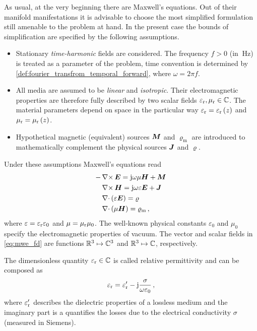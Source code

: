 As usual, at the very beginning there are Maxwell's equations.
Out of their manifold manifestations it is advisable to choose the most
simplified formulation still amenable to the problem at hand.
In the present case the bounds of simplification are specified by the following
assumptions.
\begin{itemize}
	\item Stationary \emph{time-harmonic} fields are considered.
	The frequency $f > 0$ (in $\SI{}{\hertz}$) is treated as a parameter of the
	problem, time convention is determined by
	\cref{def:fourier_transfrom_temporal_forward}, where $\omega = 2\pi f$.
	\item All media are assumed to be \emph{linear} and \emph{isotropic}.
	Their electromagnetic properties are therefore fully described by two scalar
	fields $\varepsilon_{\mathrm{r}}, \mu_{\mathrm{r}} \in \mathbb{C}$.
	The material parameters depend on space in the particular way
	$\varepsilon_{\mathrm{r}} = \varepsilon_{\mathrm{r}}\left(z\right)$ and $\mu_{\mathrm{r}} = \mu_{\mathrm{r}}\left(z\right)$.
	\item Hypothetical magnetic (equivalent) sources $\pvec{M}$ and
	$\varrho_\mathrm{m}$ are introduced to mathematically complement the
	physical sources $\pvec{J}$ and $\varrho$.
\end{itemize}

Under these assumptions Maxwell's equations read \cite{Harrington2001,Chew1999}
\begin{subequations}\label{eq:mwe_fd}
	\begin{align}
		-&\curl \pvec{E}
		= \im\omega\mu\pvec{H} + \pvec{M} \label{eq:mwe_fd_faraday} \\
		&\curl \pvec{H}
		= \im\omega\varepsilon\pvec{E} + \pvec{J} \label{eq:mwe_fd_ampere} \\
		&\divergence \left(\varepsilon\pvec{E}\right)
		= \varrho \label{eq:mwe_fd_gauss} \\
		&\divergence \left(\mu\pvec{H}\right) 
		= \varrho_\mathrm{m} \,, \label{eq:mwe_fd_gauss_magnetic}
	\end{align}
\end{subequations}
where $\varepsilon = \varepsilon_{\mathrm{r}} \varepsilon_0$ and $\mu = \mu_{\mathrm{r}} \mu_0$.
The well-known physical constants $\varepsilon_0$ and $\mu_0$ specify the
electromagnetic properties of vacuum.
The vector and scalar fields in \eqref{eq:mwe_fd} are functions
$\mathbb{R}^3 \mapsto \mathbb{C}^3$ and $\mathbb{R}^3 \mapsto \mathbb{C}$, respectively.

The dimensionless quantity $\varepsilon_{\mathrm{r}} \in \mathbb{C}$ is called relative permittivity 
and can be composed as \cite[43]{Jin2015}
\begin{equation}
	\varepsilon_{\mathrm{r}} = \varepsilon_{\mathrm{r}}^\prime - \mathrm{j} \frac{\sigma}{\omega \varepsilon_0} \,,
\end{equation}
where $\varepsilon_{\mathrm{r}}^\prime$ describes the dielectric properties of a lossless medium
and the imaginary part is a quantifies the losses due to the electrical
conductivity $\sigma$ (measured in Siemens).

